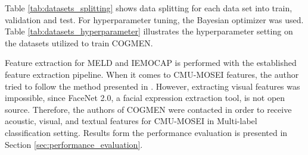 Table \ref{tab:datasets_splitting} shows data splitting for each data set into train, validation and test. For hyperparameter tuning, the Bayesian optimizer was used. Table \ref{tab:datasets_hyperparameter} illustrates the hyperparameter setting on the datasets utilized to train COGMEN. 
%
\begin{table}[h]
\caption{Data splitting.}
\centering
{}
\label{tab:datasets_splitting}
\end{table}
%
%
\begin{table}[h]
\caption{Hyperparameter settings for each dataset. \textit{ILR} denotes initial learning rate.}
\centering
{}
\label{tab:datasets_hyperparameter}
\end{table}
%
Feature extraction for MELD and IEMOCAP is performed with the established feature extraction pipeline. When it comes to CMU-MOSEI features, the author tried to follow the method presented in \cite{cmu-mosei_zadeh2018multimodal}. However, extracting visual features was impossible, since FaceNet 2.0, a facial expression extraction tool, is not open source. Therefore, the authors of COGMEN were contacted in order to receive acoustic, visual, and textual features for CMU-MOSEI in Multi-label classification setting. Results form the performance evaluation is presented in Section \ref{sec:performance_evaluation}.

